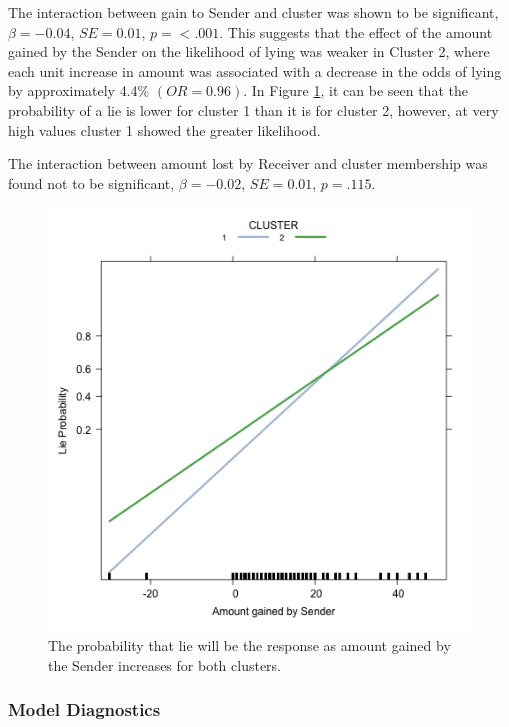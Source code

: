 \documentclass[man, floatsintext]{apa7}
\begin{document}
The interaction between gain to Sender and cluster was shown to be significant, $\beta = -0.04$, $SE = 0.01$, $p = < .001$. This suggests that the effect of the amount gained by the Sender on the likelihood of lying was weaker in Cluster 2, where each unit increase in amount was associated with a decrease in the odds of lying by approximately 4.4\% $(OR=0.96)$. In Figure \ref{fig:InteractionEffects}, it can be seen that the probability of a lie is lower for cluster 1 than it is for cluster 2, however, at very high values cluster 1 showed the greater likelihood.

The interaction between amount lost by Receiver and cluster membership was found not to be significant, $\beta = -0.02$, $SE = 0.01$, $p = .115$.


\begin{figure}[H]
	\centering
	\includegraphics[width=0.75\linewidth]{../plots/R_selfgain/effects.png}
	\caption{The probability that lie will be the response as amount gained by the Sender increases for both clusters.}
	\label{fig:InteractionEffects}
\end{figure}

\subsubsection{Model Diagnostics}
\end{document}
